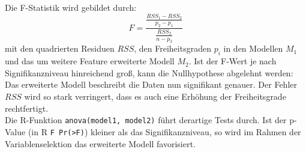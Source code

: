 Die F-Statistik wird gebildet durch:
\begin{equation}
	F=\frac{\frac{RSS_1-RSS_2}{p_2-p_1}}{\frac{RSS_2}{n-p_2}}
\end{equation}
mit den quadrierten Residuen $RSS$, den Freiheitsgraden $p_i$ in den Modellen $M_1$ und das um weitere Feature erweiterte Modell $M_2$.
Ist der F-Wert je nach Signifikanzniveau hinreichend groß, kann die Nullhypothese abgelehnt werden:
Das erweiterte Modell beschreibt die Daten nun signifikant genauer.
Der Fehler $RSS$ wird so stark verringert, dass es auch eine Erhöhung der Freiheitsgrade rechtfertigt. 
\\
Die R-Funktion \lstinline|anova(model1, model2)| führt derartige Tests durch. Ist der p-Value (in R \lstinline|F Pr(>F)|) kleiner als das Signifikanzniveau, so wird im Rahmen der Variablenselektion das erweiterte Modell favorisiert.
